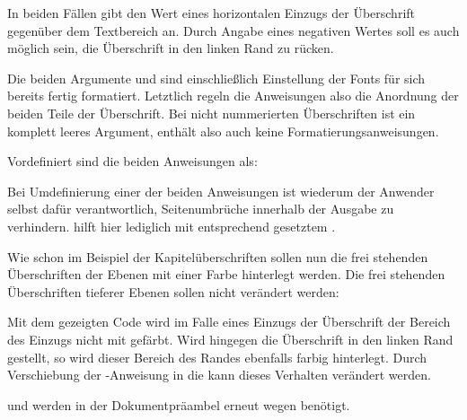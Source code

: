 In beiden Fällen gibt  den Wert eines horizontalen Einzugs
der Überschrift gegenüber dem Textbereich an. Durch Angabe eines negativen
Wertes soll es auch möglich sein, die Überschrift in den linken Rand zu
rücken.

Die beiden Argumente  und  sind einschließlich
Einstellung der Fonts für sich bereits fertig formatiert. Letztlich regeln die
Anweisungen also die Anordnung der beiden Teile der Überschrift. Bei nicht
nummerierten Überschriften ist  ein komplett leeres Argument,
enthält also auch keine Formatierungsanweisungen.

Vordefiniert sind die beiden Anweisungen als:
\begin{lstcode}
\newcommand{\sectionlinesformat}[4]{%
  \@hangfrom{\hskip #2#3}{#4}%
}
\newcommand{\sectioncatchphraseformat}[4]{\hskip #2#3#4}
\end{lstcode}

Bei Umdefinierung einer der beiden Anweisungen ist wiederum der Anwender
selbst dafür verantwortlich, Seitenumbrüche innerhalb der Ausgabe zu
verhindern. \KOMAScript{} hilft hier lediglich mit entsprechend gesetztem
.

\begin{Example}
  Wie schon im Beispiel der Kapitelüberschriften sollen nun die frei stehenden
  Überschriften der Ebenen  mit einer Farbe hinterlegt
  werden. Die frei stehenden Überschriften tieferer Ebenen sollen nicht
  verändert werden:
\begin{lstcode}[moretexcs={colorbox}]
  \makeatletter
  \renewcommand{\sectionlinesformat}[4]{%
    \Ifstr{#1}{section}{%
      \hspace*{#2}%
      \colorbox{yellow}{%
        \parbox{\dimexpr\linewidth
                        -2\fboxrule-2\fboxsep-#2}{%
          \raggedsection
          \@hangfrom{#3}{#4}%
        }%
      }%
    }{%
      \@hangfrom{\hskip #2#3}{#4}%
    }%
  }
  \makeatother
\end{lstcode}
  Mit dem gezeigten Code wird im Falle eines Einzugs der Überschrift der
  Bereich des Einzugs nicht mit gefärbt. Wird hingegen die Überschrift in den
  linken Rand gestellt, so wird dieser Bereich des Randes ebenfalls farbig
  hinterlegt. Durch Verschiebung der -Anweisung in die
   kann dieses Verhalten verändert werden.%
  \iffalse Umbruchkorrekturtext
  
  Erneut sei daran erinnert, dass \Macro{makeatletter} und \Macro{makeatother}
  nur in der Dokumentpräambel zu verwenden sind. In einer eigenen
  Wrapper-Klasse oder einem Paket haben sie zu entfallen. Sie werden auch nur
  wegen \Macro{@hangfrom} in der Definition von \Macro{sectionlinesformat}
  benötigt.%
  \else%

   und  werden in der Dokumentpräambel
  erneut wegen  benötigt.%
  \fi%
\end{Example}

